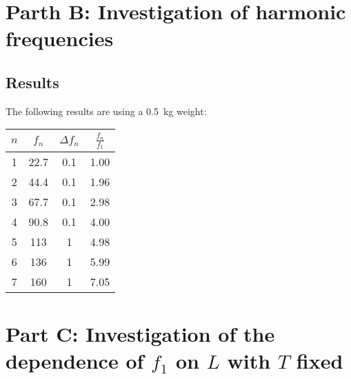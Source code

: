 \documentclass[11pt]{article}
\begin{document}
\section*{Parth B: Investigation of harmonic frequencies}
    \subsection*{Results}
        The following results are using a \SI{0.5}{\kilogram} weight:
        \begin{center}
            \begin{tabular}{c c c c}
                \toprule
                $n$ & $f_n$ & $\Delta f_n$ & $\frac{f_n}{f_1}$ \\
                \midrule
                1 & 22.7 & 0.1 & 1.00 \\
                2 & 44.4 & 0.1 & 1.96 \\
                3 & 67.7 & 0.1 & 2.98 \\
                4 & 90.8 & 0.1 & 4.00 \\
                5 & 113 & 1 & 4.98 \\
                6 & 136 & 1 & 5.99 \\
                7 & 160 & 1 & 7.05 \\
                \bottomrule
            \end{tabular}
        \end{center}
\section*{\boldmath Part C: Investigation of the dependence of $f_1$ on $L$ with $T$ fixed}
\end{document}
